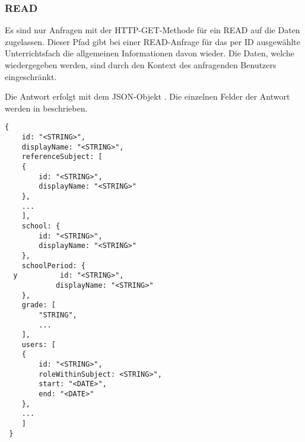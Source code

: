 \subsubsection{READ}
\label{sec:rest:api:subjects:id:read}
Es sind nur Anfragen mit der HTTP-GET-Methode für ein READ auf die Daten zugelassen.
Dieser Pfad gibt bei einer READ-Anfrage für das per ID ausgewählte Unterrichtsfach die allgemeinen Informationen davon wieder.
Die Daten, welche wiedergegeben werden, sind durch den Kontext des anfragenden Benutzers eingeschränkt.

Die Antwort erfolgt mit dem JSON-Objekt . 
Die einzelnen Felder der Antwort werden in  beschrieben.


\begin{lstlisting}[caption={JSON-Antwort für einen GET-Aufruf des Pfads /api/subjects/\$id},label={lst:code:rest:api:subjects:id:read:ret},frame=tlrb]
{
    id: "<STRING>",
    displayName: "<STRING>",
    referenceSubject: [
    {
        id: "<STRING>",
        displayName: "<STRING>"
    },
    ...
    ],
    school: {
        id: "<STRING>",
        displayName: "<STRING>"
    },
    schoolPeriod: {
  y          id: "<STRING>",
            displayName: "<STRING>"
    },
    grade: [
        "STRING",
        ...
    ],
    users: [
    {
        id: "<STRING>",
        roleWithinSubject: <STRING>",
        start: "<DATE>",
        end: "<DATE>"    
    },
    ...
    ]
 }
\end{lstlisting}

